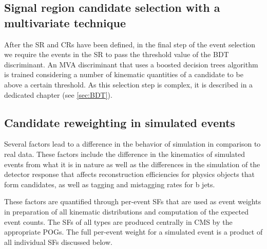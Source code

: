 \subsection{Signal region candidate selection with a multivariate technique}

After the SR and CRs have been defined, in the final step of the event selection we require the events in the SR to pass the threshold value of the BDT discriminant. An MVA discriminant that uses a boosted decision trees algorithm is trained considering a number of kinematic quantities of a candidate to be above a certain threshold. As this selection step is complex, it is described in a dedicated chapter (see \ref{sec:BDT}).

\subsection{Candidate reweighting in simulated events}

Several factors lead to a difference in the behavior of simulation in comparison to real data. These factors include the difference in the kinematics of simulated events from what it is in nature as well as the differences in the simulation of the detector response that affects reconstruction efficiencies for physics objects that form candidates, as well as tagging and mistagging rates for b jets. 

These factors are quantified through per-event SFs that are used as event weights in preparation of all kinematic distributions and computation of the expected event counts. The SFs of all types are produced centrally in CMS by the appropriate POGs. The full per-event weight for a simulated event is a product of all individual SFs discussed below.

